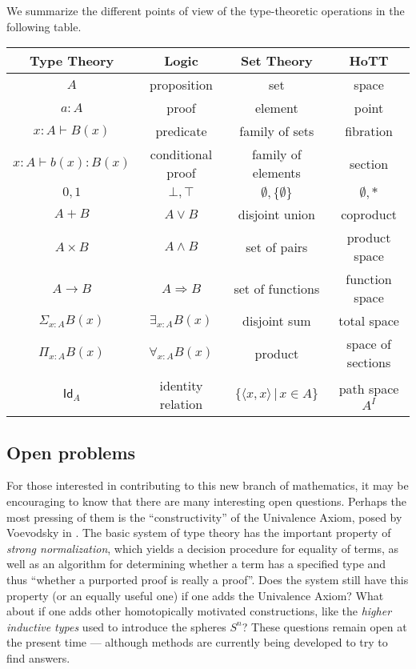 {We summarize the different points of view of the type-theoretic operations in the following table.

\begin{center}
  \begin{tabular}{c|c|c|c}
  	Type Theory & Logic & Set Theory & HoTT\\\hline
  	$A$ & proposition & set & space\\
	$a:A$ & proof & element & point \\
    	$x:A \vdash B(x)$ & predicate & family of sets & fibration \\
    	$x:A \vdash b(x) : B(x)$ & conditional proof & family of elements & section\\
	$0, 1$ & $\bot, \top$ & $\emptyset, \{ \emptyset \}$ & $\emptyset, *$\\
	$A + B$ & $A\vee B$ & disjoint union & coproduct\\
	$A\times B$ & $A\wedge B$ & set of pairs & product space\\
	$A\to B$ & $A\Rightarrow B$ & set of functions & function space\\
	$\Sigma_{x:A}B(x)$ &  $\exists_{x:A}B(x)$ & disjoint sum & total space\\
	$\Pi_{x:A}B(x)$ &  $\forall_{x:A}B(x)$ & product & space of sections\\
	$\mathsf{Id}_{A}$ & identity relation & $\{\langle x,x\rangle\, |\, x\in A\}$ & path space $A^I$
  \end{tabular}
\end{center}


\subsection*{Open problems} 

For those interested in contributing to this new branch of mathematics, it may be encouraging to know that there are many interesting open questions.  Perhaps the most pressing of them is the ``constructivity'' of the Univalence Axiom, posed by Voevodsky in \cite{Vo2012}.  The basic system of type theory has the important property of \emph{strong normalization}, which yields a decision procedure for equality of terms, as well as an algorithm for determining whether a term has a specified type and thus ``whether a purported proof is really a proof''.  Does the system still have this property (or an equally useful one) if one adds the Univalence Axiom?  What about if one adds other homotopically motivated constructions, like the \emph{higher inductive types} used to introduce the spheres $S^n$?  These questions remain open at the present time --- although methods are currently being developed to try to find answers.

}
